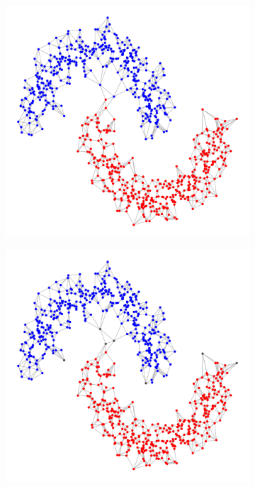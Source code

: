 \documentclass{article}
\newcommand{\1}{\mathbf{1}}
\theoremstyle{aldenthm}
\theoremstyle{aldenrmrk}
\begin{document}
\begin{figure}
\begin{adjustbox}{minipage=\linewidth,scale=0.8}
\begin{subfigure}{.24\linewidth}
			\caption{}
		\end{subfigure}
		\begin{subfigure}{.24\linewidth}
			\includegraphics[width=\linewidth]{example2plots/row1_conductance_cluster}
			\caption{}
		\end{subfigure}
		\begin{subfigure}{.24\linewidth}
			\includegraphics[width=\linewidth]{example2plots/row1_density_cluster}
			\caption{}
		\end{subfigure}
		

\end{adjustbox}
\end{figure}
\end{document}

